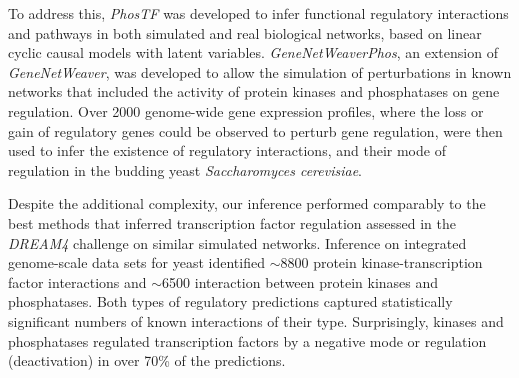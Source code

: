 \documentclass[10pt,letterpaper]{article}
\newcommand{\extendedGNW}{GeneNetWeaverPhos}
\newcommand{\PKTFX}{PhosTF}
\begin{document}
To address this, \textit{\PKTFX{}} was developed to infer functional regulatory interactions and pathways in both simulated and real biological networks, based on linear cyclic causal models with latent variables. 
\textit{\extendedGNW{}}, an extension of \textit{GeneNetWeaver}, was developed to allow the simulation of perturbations in known networks that included the activity of protein kinases and phosphatases on gene regulation.
Over 2000 genome-wide gene expression profiles, where the loss or gain of regulatory genes could be observed to perturb gene regulation, were then used to infer the existence of regulatory interactions, and their mode of regulation in the budding yeast \textit{Saccharomyces cerevisiae}.

Despite the additional complexity, our inference performed comparably to the best methods that inferred transcription factor regulation assessed in the \textit{DREAM4} challenge on similar simulated networks.
Inference on integrated genome-scale data sets for yeast identified $\boldsymbol\sim$8800 protein kinase-transcription factor interactions and $\boldsymbol\sim$6500 interaction between protein kinases and phosphatases.
Both types of regulatory predictions captured statistically significant numbers of known interactions of their type. Surprisingly, kinases and phosphatases regulated transcription factors by a negative mode or regulation (deactivation) in over 70\% of the predictions. 
\mdseries\normalsize
\end{document}
